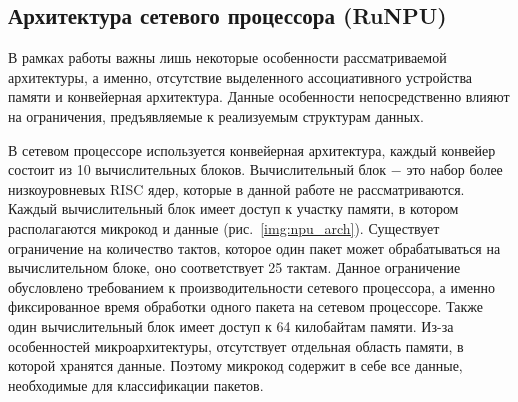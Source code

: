 \documentclass[oneside,final,12pt]{extarticle}
\begin{document}
        \subsection{Архитектура сетевого процессора (RuNPU)}
            \label{sect:arch}
            В рамках работы важны лишь некоторые особенности рассматриваемой архитектуры, а именно, отсутствие выделенного ассоциативного устройства памяти и конвейерная архитектура. 
            Данные особенности непосредственно влияют на ограничения, предъявляемые к реализуемым структурам данных.

            В сетевом процессоре используется конвейерная архитектура, каждый конвейер состоит из 10 вычислительных блоков. 
            Вычислительный блок $-$ это набор более низкоуровневых RISC ядер, которые в данной работе не рассматриваются. 
            Каждый вычислительный блок имеет доступ к участку памяти, в котором располагаются микрокод и данные (рис.~\ref{img:npu_arch}).
            Существует ограничение на количество тактов, которое один пакет может обрабатываться на вычислительном блоке, оно соответствует 25 тактам.
            Данное ограничение обусловлено требованием к производительности сетевого процессора, а именно фиксированное время обработки одного пакета на сетевом процессоре.
            Также один вычислительный блок имеет доступ к 64 килобайтам памяти.
            Из-за особенностей микроархитектуры, отсутствует отдельная область памяти, в которой хранятся данные. Поэтому микрокод содержит в себе все данные,
            необходимые для классификации пакетов.
\end{document}
